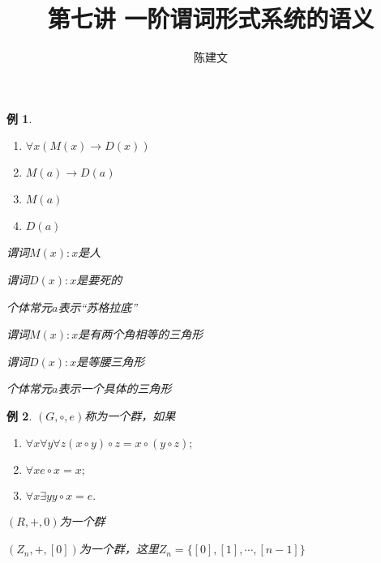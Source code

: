 \documentclass{article}
\newtheorem*{Example}{例}
\begin{document}
\begin{CJK*}{UTF8}{gbsn}
  \title{第七讲 一阶谓词形式系统的语义}
  \author{陈建文}
  \maketitle

  \begin{Example}$\quad$

    \begin{enumerate}
      \item $\forall x(M(x)\to D(x))$
      \item $M(a)\to D(a)$
      \item $M(a)$
      \item $D(a)$
    \end{enumerate}


    谓词$M(x):x$是人

    谓词$D(x):x$是要死的

    个体常元$a$表示“苏格拉底”


    谓词$M(x):x$是有两个角相等的三角形

    谓词$D(x):x$是等腰三角形

    个体常元$a$表示一个具体的三角形
    

    
  \end{Example}
  \begin{Example}
    $(G,\circ, e)$称为一个群，如果
    \begin{enumerate}
      \item $\forall x\forall y\forall z (x\circ y)\circ z=x\circ(y\circ z);$
      \item $\forall x e\circ x = x;$
      \item $\forall x \exists y y\circ x=e.$
    \end{enumerate}

    $(R,+,0)$为一个群

    $(Z_n,+,[0])$为一个群，这里$Z_n=\{[0],[1],\cdots,[n-1]\}$
  \end{Example}
  

\end{CJK*}
\end{document}
